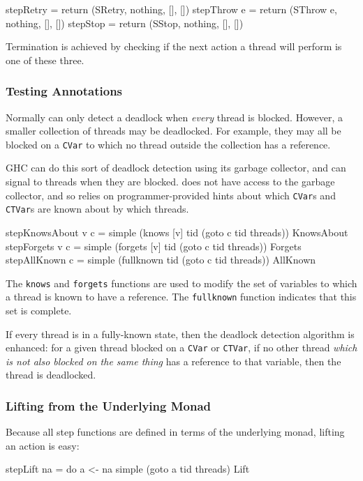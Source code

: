 \begin{haskellcode}
stepRetry   = return (SRetry,   nothing, [], [])
stepThrow e = return (SThrow e, nothing, [], [])
stepStop    = return (SStop,    nothing, [], [])
\end{haskellcode}

Termination is achieved by checking if the next action a thread will
perform is one of these three.

\subsubsection{Testing Annotations}
\label{sec:execution-stepwise-annotations}

Normally \dejafu{} can only detect a deadlock when \emph{every} thread
is blocked. However, a smaller collection of threads may be
deadlocked.  For example, they may all be blocked on a \verb|CVar| to
which no thread outside the collection has a reference.

GHC can do this sort of deadlock detection using its garbage
collector, and can signal to threads when they are blocked. \dejafu{}
does not have access to the garbage collector, and so relies on
programmer-provided hints about which \verb|CVar|s and \verb|CTVar|s
are known about by which threads.

\begin{haskellcode}
stepKnowsAbout v c = simple (knows   [v] tid (goto c tid threads)) KnowsAbout
stepForgets    v c = simple (forgets [v] tid (goto c tid threads)) Forgets
stepAllKnown     c = simple (fullknown   tid (goto c tid threads)) AllKnown
\end{haskellcode}

The \verb|knows| and \verb|forgets| functions are used to modify the
set of variables to which a thread is known to have a reference. The
\verb|fullknown| function indicates that this set is complete.

If every thread is in a fully-known state, then the deadlock detection
algorithm is enhanced: for a given thread blocked on a \verb|CVar| or
\verb|CTVar|, if no other thread \emph{which is not also blocked on
  the same thing} has a reference to that variable, then the thread is
deadlocked.

\subsubsection{Lifting from the Underlying Monad}
\label{sec:execution-stepwise-lift}

Because all step functions are defined in terms of the underlying
monad, lifting an action is easy:

\begin{haskellcode}
stepLift na = do
  a <- na
  simple (goto a tid threads) Lift
\end{haskellcode}
